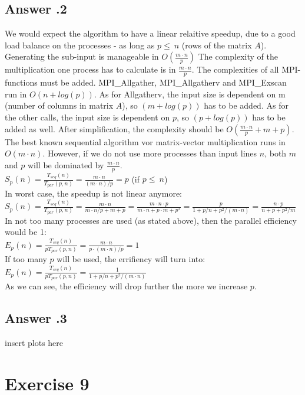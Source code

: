\documentclass[a4paper,%
11pt,%
DIV=12,
headsepline,%
headings=normal,
]{scrartcl}
\newcounter{curex}
\newcommand{\exercise}[1]{\section*{Exercise #1}\setcounter{curex}{#1}}
\newcommand{\answer}[1]{\subsection*{Answer \arabic{curex}.#1}}
\begin{document}
\answer{2}
We would expect the algorithm to have a linear relaitive speedup, due to a good load balance on the processes - as long as $p \leq\ n$  (rows of the matrix $A$). Generating the sub-input is manageable in $O(\frac{m \cdot n}{p})$ The complexity of the multiplication one process has to calculate is in $\frac{m \cdot n}{p}$. The complexities of all MPI-functions must be added. MPI\_Allgather,  MPI\_Allgatherv and MPI\_Exscan run in $O(n + log(p))$. As for Allgatherv, the input size is dependent on m (number of columns in matrix $A$), so $(m + log(p))$ has to be added. As for the other calls, the input size is dependent on $p$, so $(p + log(p))$ has to be added as well. After simplification, the complexity should be $O(\frac{m \cdot n}{p} + m + p)$.\\
The best known sequential algorithm vor matrix-vector multiplication runs in $O(m \cdot n)$. However, if we do not use more processes than input lines $n$, both $m$ and $p$ will be dominated by $\frac{m \cdot n}{p}$.\\
\begin{math}S_{p}(n)=\frac{T_{seq}(n)}{T_{par}(p,n)} = \frac{m \cdot n}{(m \cdot n)/p } = p \end{math} (if $p \leq\ n$)\\
In worst case, the speedup is not linear anymore:\\
\begin{math}S_{p}(n)=\frac{T_{seq}(n)}{T_{par}(p,n)} = \frac{m \cdot n}{m \cdot n/p + m + p} = \frac{m \cdot n \cdot p}{m \cdot n + p \cdot  m + p^2} = \frac{p}{1 + p/n + p^2/(m \cdot n)} = \frac{n \cdot p}{n + p + p^2/m}\end{math}\\
In not too many processes are used (as stated above), then the parallel efficiency would be 1:\\
\begin{math}E_{p}(n)=\frac{T_{seq}(n)}{pT_{par}(p,n)} = \frac{m \cdot n}{p \cdot (m \cdot n)/p} = 1 \end{math}\\
If too many $p$ will be used, the errifiency will turn into:\\
\begin{math}E_{p}(n)=\frac{T_{seq}(n)}{pT_{par}(p,n)} = \frac{1}{1 + p/n + p^2/(m \cdot n)} \end{math}\\
As we can see, the efficiency will drop further the more we increase $p$.
\answer{3}
insert plots here

\exercise{9}
\end{document}
